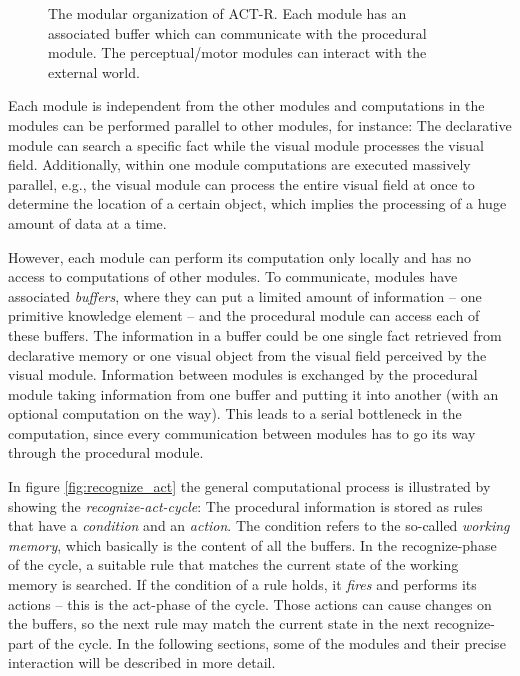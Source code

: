 \begin{figure}[hbt]
\begin{center}
\caption{The modular organization of ACT-R. Each module has an associated buffer which can communicate with the procedural module. The perceptual/motor modules can interact with the external world. \cite[fig. 1]{anderson_integrated_2004}}
\label{fig:modular_organization}
\end{center}
\end{figure}


Each module is independent from the other modules and computations in the modules can be performed parallel to other modules, for instance: The declarative module can search a specific fact while the visual module processes the visual field. Additionally, within one module computations are executed massively parallel, e.g., the visual module can process the entire visual field at once to determine the location of a certain object, which implies the processing of a huge amount of data at a time.

However, each module can perform its computation only locally and has no access to computations of other modules. To communicate, modules have associated \emph{buffers}, where they can put a limited amount of information -- one primitive knowledge element -- and the procedural module can access each of these buffers. The information in a buffer could be one single fact retrieved from declarative memory or one visual object from the visual field perceived by the visual module. Information between modules is exchanged by the procedural module taking information from one buffer and putting it into another (with an optional computation on the way). This leads to a serial bottleneck in the computation, since every communication between modules has to go its way through the procedural module.

In figure \ref{fig:recognize_act} the general computational process is illustrated by showing the \emph{recognize-act-cycle}: The procedural information is stored as rules that have a \emph{condition} and an \emph{action}. The condition refers to the so-called \emph{working memory}, which basically is the content of all the buffers. In the recognize-phase of the cycle, a suitable rule that matches the current state of the working memory is searched. If the condition of a rule holds, it \emph{fires} and performs its actions -- this is the act-phase of the cycle. Those actions can cause changes on the buffers, so the next rule may match the current state in the next recognize-part of the cycle. In the following sections, some of the modules and their precise interaction will be described in more detail.

